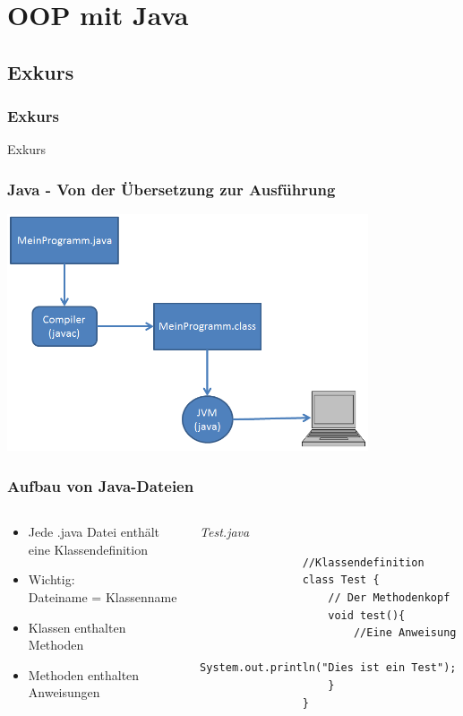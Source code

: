 
\section{OOP mit Java}
\subsection{Exkurs}
\begin{frame}[fragile]
	\frametitle{Exkurs}
\huge Exkurs
\end{frame}

\begin{frame}
	\frametitle{Java - Von der \"Ubersetzung zur Ausf\"uhrung}
	\center
	\includegraphics[width=0.8\textwidth,
	keepaspectratio=true]{bilder/java_process.png}
\end{frame}

\begin{frame}[fragile]
	\frametitle{Aufbau von Java-Dateien}
	\begin{columns}
		\begin{column}{0.5\textwidth}
			\small
			\begin{itemize}
			  \item Jede .java Datei enth\"alt eine Klassendefinition
			  \item Wichtig: \\
			  		Dateiname = Klassenname
			  \item Klassen enthalten Methoden
			  \item Methoden enthalten Anweisungen
			\end{itemize}
			\normalsize
		\end{column}
		\begin{column}{0.5\textwidth}{\tiny \itshape Test.java}
			\begin{lstlisting}
				//Klassendefinition
				class Test {
					// Der Methodenkopf
					void test(){
						//Eine Anweisung
						System.out.println("Dies ist ein Test");
					}
				}
			\end{lstlisting}
		\end{column}
	\end{columns}
\end{frame}

